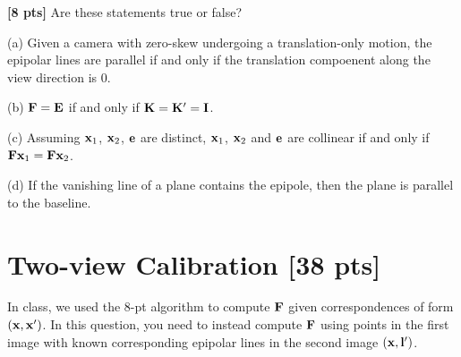\begin{questions}
    \begin{tcolorbox}[fit,height fill, width=\textwidth, blank, borderline={0.5pt}{-2pt},halign=left, valign=center, nobeforeafter]


    \end{tcolorbox}
    \question \textbf{[8 pts]} Are these statements true or false?

    (a) Given a camera with zero-skew undergoing a translation-only motion, the epipolar lines are parallel if and only if the translation compoenent along the view direction is $0$.

    \begin{tcolorbox}[fit,height=4.2cm, width=\textwidth, blank, borderline={0.5pt}{-2pt},halign=left, valign=center, nobeforeafter]
    \end{tcolorbox}

    (b) $\mathbf{F} = \mathbf{E}$ if and only if $\mathbf{K} = \mathbf{K}' = \mathbf{I}$.

    \begin{tcolorbox}[fit,height=4.2cm, width=\textwidth, blank, borderline={0.5pt}{-2pt},halign=left, valign=center, nobeforeafter]
    \end{tcolorbox}

    (c) Assuming $\mathbf{x}_1$, $\mathbf{x}_2$, $\mathbf{e}$ are distinct, $\mathbf{x}_1$, $\mathbf{x}_2$ and $\mathbf{e}$ are collinear if and only if $\mathbf{F}\mathbf{x}_1 = \mathbf{F}\mathbf{x}_2$.

    \begin{tcolorbox}[fit,height=4.2cm, width=\textwidth, blank, borderline={0.5pt}{-2pt},halign=left, valign=center, nobeforeafter]
    \end{tcolorbox}

    (d) If the vanishing line of a plane contains the epipole, then the plane is parallel to the baseline.

    \begin{tcolorbox}[fit,height fill, width=\textwidth, blank, borderline={0.5pt}{-2pt},halign=left, valign=center, nobeforeafter]
    \end{tcolorbox}

    \clearpage

    \section{Two-view Calibration [38 pts]}
    \question In class, we used the $8$-pt algorithm to compute $\mathbf{F}$ given correspondences of form $(\mathbf{x}, \mathbf{x}')$. In this question, you need to instead compute $\mathbf{F}$ using points in the first image with known corresponding epipolar lines in the second image $(\mathbf{x}, \mathbf{l}')$.


\end{questions}
